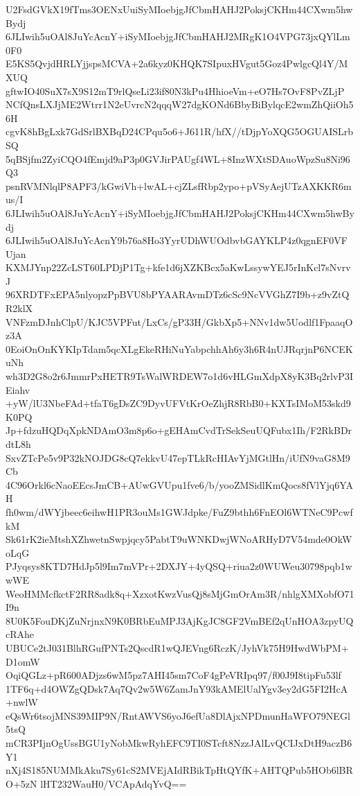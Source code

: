U2FsdGVkX19fTms3OENxUuiSyMIoebjgJfCbmHAHJ2PoksjCKHm44CXwm5hwBydj
6JLIwih5uOAl8JuYcAcnY+iSyMIoebjgJfCbmHAHJ2MRgK1O4VPG73jxQYlLm0F0
E5KS5QvjdHRLYjjspsMCVA+2a6kyz0KHQK7SIpuxHVgut5Goz4PwlgcQl4Y/MXUQ
gftwIO40SuX7sX9S12mT9rlQseLi23if80N3kPu4HhioeVm+eO7Hs7OvF8PvZLjP
NCfQnsLXJjME2Wtrr1N2eUvrcN2qqqW27dgKONd6BbyBiBylqcE2wmZhQiiOh56H
cgvK8hBgLxk7GdSrlBXBqD24CPqu5o6+J611R/hfX//tDjpYoXQG5OGUAISLrbSQ
5qBSjfm2ZyiCQO4fEmjd9aP3p0GVJirPAUgf4WL+8InzWXtSDAuoWpzSu8Ni96Q3
psnRVMNlqlP8APF3/kGwiVh+lwAL+cjZLsfRbp2ypo+pVSyAejUTzAXKKR6mus/I
6JLIwih5uOAl8JuYcAcnY+iSyMIoebjgJfCbmHAHJ2PoksjCKHm44CXwm5hwBydj
6JLIwih5uOAl8JuYcAcnY9b76a8Ho3YyrUDhWUOdbvbGAYKLP4z0qgnEF0VFUjan
KXMJYnp22ZcLST60LPDjP1Tg+kfe1d6jXZKBcx5aKwLssywYEJ5rInKcl7sNvrvJ
96XRDTFxEPA5nlyopzPpBVU8bPYAARAvmDTz6cSc9NcVVGhZ7I9b+z9vZtQR2klX
VNFzmDJnhClpU/KJC5VPFut/LxCs/gP33H/GkbXp5+NNv1dw5Uodlf1FpaaqOz3A
0EoiOnOnKYKIpTdam5qcXLgEkeRHiNuYabpchhAh6y3h6R4nUJRqrjnP6NCEKuNh
wh3D2G8o2r6JmmrPxHETR9TsWalWRDEW7o1d6vHLGmXdpX8yK3Bq2rlvP3IEiahv
+yW/lU3NbeFAd+tfaT6gDsZC9DyvUFVtKrOeZhjR8RbB0+KXTsIMoM53skd9K0PQ
Jp+fdzuHQDqXpkNDAmO3m8p6o+gEHAmCvdTrSekSeuUQFubx1Ih/F2RkBDrdtL8h
SxvZTcPe5v9P32kNOJDG8cQ7ekkvU47epTLkRcHIAvYjMGtlHn/iUfN9vaG8M9Cb
4C96Orkl6cNaoEEcsJmCB+AUwGVUpu1fve6/b/yooZMSidlKmQocs8fVlYjq6YAH
fh0wm/dWYjbeec6eihwH1PR3ouMs1GWJdpke/FuZ9bthh6FnEOl6WTNeC9PcwfkM
Sk61rK2ieMtshXZhwetnSwpjqcy5PabtT9uWNKDwjWNoARHyD7V54mde0OkWoLqG
PJyqsys8KTD7HdJp5l9Im7mVPr+2DXJY+4yQSQ+riua2z0WUWeu30798pqb1wwWE
WeoHMMcfkctF2RR8adk8q+XzxotKwzVusQj8sMjGmOrAm3R/nhlgXMXobfO71I9n
8U0K5FouDKjZuNrjnxN9K0BRbEuMPJ3AjKgJC8GF2VmBEf2qUnHOA3zpyUQcRAhe
UBUCe2tJ031BlhRGufPNTs2QscdR1wQJEVng6RczK/JyhVk75H9HwdWbPM+D1omW
OqiQGLz+pR600ADjzs6wM5pz7AHI45sm7CoF4gPeVRIpq97/f00J9I8tipFu53lf
1TF6q+d4OWZgQDsk7Aq7Qv2w5W6ZamJnY93kAMElUalYgv3ey2dG5FI2HcA+nwlW
eQsWr6tsojMNS39MIP9N/RntAWVS6yoJ6efUa8DlAjxNPDmunHaWFO79NEGl5tsQ
mCR3PIjnOgUssBGU1yNobMkwRyhEFC9TI0STcft8NzzJAlLvQCIJxDtH9aczB6Y1
nXj4S185NUMMkAku7Sy61cS2MVEjAIdRBikTpHtQYfK+AHTQPub5HOb6lBRO+5zN
lHT232WauH0/VCApAdqYvQ==
